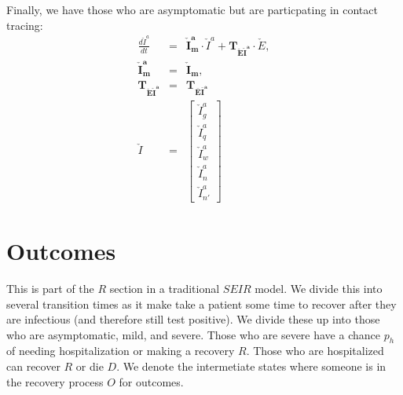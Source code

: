 \documentclass[notitlepage, superscriptaddress]{revtex4-2}
\begin{document}
Finally, we have those who are asymptomatic but are particpating in contact tracing:
\begin{eqnarray}
\frac{d\check{I}^{a}}{dt} &=& \boldsymbol{\check{I}^{a}_{m}} \cdot \check{I}^{a} + \boldsymbol{T_{\check{E}\check{I}^{a}}} \cdot  \check{E}, \\
\boldsymbol{\check{I}^{a}_{m}} &=& \boldsymbol{\check{I}_{m}}, \\ 
%
\boldsymbol{T_{\check{E}\check{I}^{a}}} &=& \boldsymbol{T_{\bar{E}\bar{I}^{a}}} \\
%
\check{I} &=& 
\begin{bmatrix}
\check{I}^{a}_{g} \\[.15cm] \check{I}^{a}_{q} \\[.15cm] \check{I}^{a}_{w}\\[.15cm] \check{I}^{a}_{n} \\[.15cm] \check{I}^{a}_{n'}
\end{bmatrix}
\end{eqnarray}


\section{Outcomes}
This is part of the $R$ section in a traditional $SEIR$ model. We divide this into several transition times as it make take a patient some time to recover after they are infectious (and therefore still test positive). We divide these up into those who are asymptomatic, mild, and severe. Those who are severe have a chance $p_h$ of needing hospitalization or making a recovery $R$. Those who are hospitalized can recover $R$ or die $D$. We denote the intermetiate states where someone is in the recovery process $O$ for outcomes.
\end{document}
